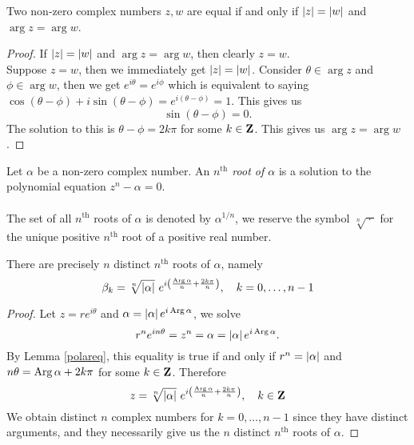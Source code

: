 \begin{lemma}\label{polareq}
Two non-zero complex numbers $z,w$ are equal if and only if $\left\lvert z\right\rvert = \left\lvert w\right\rvert$ and $\arg z = \arg w$.
\end{lemma}
\begin{proof}
If $\left\lvert z\right\rvert = \left\lvert w\right\rvert$ and $\arg z = \arg w$, then clearly $z = w$.\\[0.5em]
Suppose $z = w$, then we immediately get $\left\lvert z\right\rvert = \left\lvert w\right\rvert$. Consider $\theta \in \arg z$ and $\phi \in \arg w$, then we get $e^{i\theta} = e^{i\phi}$ which is equivalent to saying $\cos(\theta - \phi) + i\sin(\theta - \phi) = e^{i(\theta - \phi)} = 1$. This gives us
\[\sin (\theta - \phi) = 0.\]
The solution to this is $\theta - \phi = 2k\pi$ for some $k\in \mathbf Z$. This gives us $\arg z = \arg w$.
\end{proof}

\vspace*{1em}

\begin{definition}[Roots]
Let $\alpha$ be a non-zero complex number. An \emph{$n^{\text{th}}$ root of $\alpha$} is a solution to the polynomial equation $z^n - \alpha = 0$.\\
\\
The set of all $n^{\text{th}}$ roots of $\alpha$ is denoted by $\alpha^{1/n}$, we reserve the symbol $\sqrt[n]{\ \cdot\ }$ for the unique positive $n^{\text{th}}$ root of a positive real number.
\end{definition}

\vspace*{1em}

\begin{proposition}\label{distroot}
There are precisely $n$ distinct $n^{\text{th}}$ roots of $\alpha$, namely
\[\beta_k = \sqrt[n]{\abs{\alpha}}\ e^{i\left(\frac{\parg \alpha}{n} + \frac{2k\pi}{n}\right)},\quad k = 0,\ldots,n-1\]
\end{proposition}
\begin{proof}
Let $z = re^{i\theta}$ and $\alpha = \left\lvert\alpha\right\rvert e^{i\operatorname{Arg}\alpha}$, we solve
\[r^ne^{in\theta} = z^n = \alpha = \left\lvert\alpha\right\rvert e^{i\operatorname{Arg}\alpha}.\]
By Lemma \ref{polareq}, this equality is true if and only if $r^n = \left\lvert\alpha\right\rvert$ and $n\theta = \operatorname{Arg}\alpha + 2k\pi$ for some $k \in \mathbf Z$. Therefore
\[z = \sqrt[n]{\left\lvert\alpha\right\rvert}\ e^{i\left(\frac{\operatorname{Arg} \alpha}{n} + \frac{2k\pi}{n}\right)},\quad k \in \mathbf Z\]
We obtain distinct $n$ complex numbers for $k = 0,\ldots,n-1$ since they have distinct arguments, and they necessarily give us the $n$ distinct $n^{\text{th}}$ roots of $\alpha$.
\end{proof}

